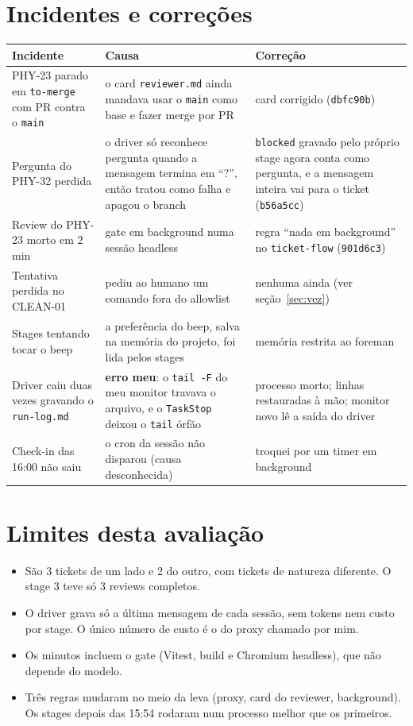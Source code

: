 \documentclass[11pt,a4paper]{article}
\newcommand{\tk}[1]{\texttt{#1}}
\begin{document}
\section{Incidentes e correções}\label{sec:incidentes}
{\small
\begin{tabularx}{\linewidth}{@{}p{3.6cm}Yp{4.1cm}@{}}
\toprule
Incidente & Causa & Correção \\
\midrule
PHY-23 parado em \tk{to-merge} com PR contra o \tk{main} & o card \tk{reviewer.md} ainda mandava usar o \tk{main} como base e fazer merge por PR & card corrigido (\tk{dbfc90b}) \\
Pergunta do PHY-32 perdida & o driver só reconhece pergunta quando a mensagem termina em ``?'', então tratou como falha e apagou o branch & \tk{blocked} gravado pelo próprio stage agora conta como pergunta, e a mensagem inteira vai para o ticket (\tk{b56a5cc}) \\
Review do PHY-23 morto em 2 min & gate em background numa sessão headless & regra ``nada em background'' no \tk{ticket-flow} (\tk{901d6c3}) \\
Tentativa perdida no CLEAN-01 & pediu ao humano um comando fora do allowlist & nenhuma ainda (ver seção~\ref{sec:vez}) \\
Stages tentando tocar o beep & a preferência do beep, salva na memória do projeto, foi lida pelos stages & memória restrita ao foreman \\
Driver caiu duas vezes gravando o \tk{run-log.md} & \textbf{erro meu}: o \tk{tail -F} do meu monitor travava o arquivo, e o \tk{TaskStop} deixou o \tk{tail} órfão & processo morto; linhas restauradas à mão; monitor novo lê a saída do driver \\
Check-in das 16:00 não saiu & o cron da sessão não disparou (causa desconhecida) & troquei por um timer em background \\
\bottomrule
\end{tabularx}}

\section{Limites desta avaliação}
\begin{itemize}
  \item São 3 tickets de um lado e 2 do outro, com tickets de natureza diferente. O stage 3 teve só 3 reviews completos.
  \item O driver grava só a última mensagem de cada sessão, sem tokens nem custo por stage. O único número de custo é o do proxy chamado por mim.
  \item Os minutos incluem o gate (Vitest, build e Chromium headless), que não depende do modelo.
  \item Três regras mudaram no meio da leva (proxy, card do reviewer, background). Os stages depois das 15:54 rodaram num processo melhor que os primeiros.
\end{itemize}
\end{document}
